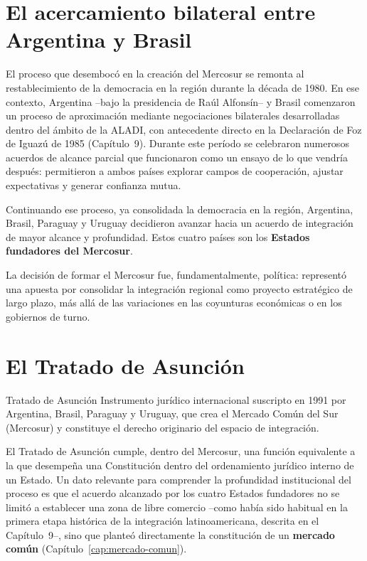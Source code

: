 \documentclass[12pt,oneside]{book}
\begin{document}
\section{El acercamiento bilateral entre Argentina y Brasil}

El proceso que desembocó en la creación del Mercosur se remonta al restablecimiento de la democracia en la región durante la década de 1980. En ese contexto, Argentina --bajo la presidencia de Raúl Alfonsín-- y Brasil comenzaron un proceso de aproximación mediante negociaciones bilaterales desarrolladas dentro del ámbito de la ALADI, con antecedente directo en la Declaración de Foz de Iguazú de 1985 (Capítulo~9). Durante este período se celebraron numerosos acuerdos de alcance parcial que funcionaron como un ensayo de lo que vendría después: permitieron a ambos países explorar campos de cooperación, ajustar expectativas y generar confianza mutua.

Continuando ese proceso, ya consolidada la democracia en la región, Argentina, Brasil, Paraguay y Uruguay decidieron avanzar hacia un acuerdo de integración de mayor alcance y profundidad. Estos cuatro países son los \textbf{Estados fundadores del Mercosur}.

\begin{importante}
La decisión de formar el Mercosur fue, fundamentalmente, política: representó una apuesta por consolidar la integración regional como proyecto estratégico de largo plazo, más allá de las variaciones en las coyunturas económicas o en los gobiernos de turno.
\end{importante}

\section{El Tratado de Asunción}

\begin{definicion}{Tratado de Asunción}
Instrumento jurídico internacional suscripto en 1991 por Argentina, Brasil, Paraguay y Uruguay, que crea el Mercado Común del Sur (Mercosur) y constituye el derecho originario del espacio de integración.
\end{definicion}

El Tratado de Asunción cumple, dentro del Mercosur, una función equivalente a la que desempeña una Constitución dentro del ordenamiento jurídico interno de un Estado. Un dato relevante para comprender la profundidad institucional del proceso es que el acuerdo alcanzado por los cuatro Estados fundadores no se limitó a establecer una zona de libre comercio --como había sido habitual en la primera etapa histórica de la integración latinoamericana, descrita en el Capítulo~9--, sino que planteó directamente la constitución de un \textbf{mercado común} (Capítulo~\ref{cap:mercado-comun}).
\end{document}
